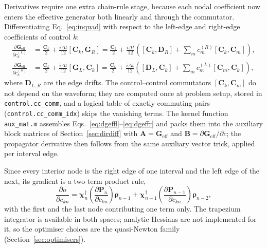 \documentclass[11pt,a4paper]{article}
\newcommand{\code}[1]{\texttt{#1}}
\begin{document}
Derivatives require one extra chain-rule stage, because each nodal
coefficient now enters the effective generator both linearly and through
the commutator. Differentiating Eq.~\eqref{eq:inquad} with respect to the
left-edge and right-edge coefficients of control $k$:
\begin{align}
  \frac{\partial\mathbf{G}_{\mathrm{eff}}}{\partial c_{k}^{(L)}}
  &=\frac{\mathbf{C}_k}{2}
   +\frac{i\Delta t}{12}\left[\mathbf{C}_k,\mathbf{G}_R\right]
  =\frac{\mathbf{C}_k}{2}
   +\frac{i\Delta t}{12}\left(\left[\mathbf{C}_k,\mathbf{D}_R\right]
   +\sum_{m}c_{m}^{(R)}\left[\mathbf{C}_k,\mathbf{C}_m\right]\right),
   \label{eq:dgeffl}\\
  \frac{\partial\mathbf{G}_{\mathrm{eff}}}{\partial c_{k}^{(R)}}
  &=\frac{\mathbf{C}_k}{2}
   +\frac{i\Delta t}{12}\left[\mathbf{G}_L,\mathbf{C}_k\right]
  =\frac{\mathbf{C}_k}{2}
   +\frac{i\Delta t}{12}\left(\left[\mathbf{D}_L,\mathbf{C}_k\right]
   +\sum_{m}c_{m}^{(L)}\left[\mathbf{C}_m,\mathbf{C}_k\right]\right),
   \label{eq:dgeffr}
\end{align}
where $\mathbf{D}_{L,R}$ are the edge drifts. The control--control
commutators $[\mathbf{C}_k,\mathbf{C}_m]$ do not depend on the waveform;
they are computed once at problem setup, stored in
\code{control.cc\_comm}, and a logical table of exactly commuting pairs
(\code{control.cc\_comm\_idx}) skips the vanishing terms. The kernel
function \code{aux\_mat.m} assembles
Eqs.~\eqref{eq:dgeffl}--\eqref{eq:dgeffr} and packs them into the
auxiliary block matrices of Section~\ref{sec:dirdiff} with
$\mathbf{A}=\mathbf{G}_{\mathrm{eff}}$ and
$\mathbf{B}=\partial\mathbf{G}_{\mathrm{eff}}/\partial c$; the propagator
derivative then follows from the same auxiliary vector trick, applied per
interval edge.

Since every interior node is the right edge of one interval and the left
edge of the next, its gradient is a two-term product rule,
\begin{equation}
  \frac{\partial o}{\partial c_{kn}}
  =\boldsymbol{\chi}_{n}^{\dagger}
   \left(\frac{\partial\mathbf{P}_n}{\partial c_{kn}}\right)
   \boldsymbol{\rho}_{n-1}
  +\boldsymbol{\chi}_{n-1}^{\dagger}
   \left(\frac{\partial\mathbf{P}_{n-1}}{\partial c_{kn}}\right)
   \boldsymbol{\rho}_{n-2},
\end{equation}
with the first and the last node contributing one term only. The
trapezium integrator is available in both spaces; analytic Hessians are
not implemented for it, so the optimiser choices are the quasi-Newton
family (Section~\ref{sec:optimisers}).
\end{document}
